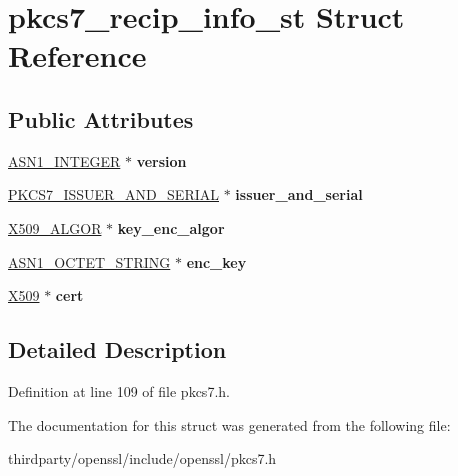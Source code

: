 \hypertarget{structpkcs7__recip__info__st}{}\section{pkcs7\+\_\+recip\+\_\+info\+\_\+st Struct Reference}
\label{structpkcs7__recip__info__st}
\subsection*{Public Attributes}
\begin{DoxyCompactItemize}
\item 
\mbox{\label{structpkcs7__recip__info__st_a2dab371fc11bb2b2a31c8d6ae805b7d4}} 
\hyperlink{structasn1__string__st}{A\+S\+N1\+\_\+\+I\+N\+T\+E\+G\+ER} $\ast$ {\bfseries version}
\item 
\mbox{\label{structpkcs7__recip__info__st_a518df74b0610022385c23e30d659c003}} 
\hyperlink{structpkcs7__issuer__and__serial__st}{P\+K\+C\+S7\+\_\+\+I\+S\+S\+U\+E\+R\+\_\+\+A\+N\+D\+\_\+\+S\+E\+R\+I\+AL} $\ast$ {\bfseries issuer\+\_\+and\+\_\+serial}
\item 
\mbox{\label{structpkcs7__recip__info__st_ad337ba9cf15d47888dfff734116dbed5}} 
\hyperlink{struct_x509__algor__st}{X509\+\_\+\+A\+L\+G\+OR} $\ast$ {\bfseries key\+\_\+enc\+\_\+algor}
\item 
\mbox{\label{structpkcs7__recip__info__st_a1dd5082129a2141e6a6ea4accc3ec700}} 
\hyperlink{structasn1__string__st}{A\+S\+N1\+\_\+\+O\+C\+T\+E\+T\+\_\+\+S\+T\+R\+I\+NG} $\ast$ {\bfseries enc\+\_\+key}
\item 
\mbox{\label{structpkcs7__recip__info__st_a6be787ca74a954b3bb37d84d46aa9418}} 
\hyperlink{structx509__st}{X509} $\ast$ {\bfseries cert}
\end{DoxyCompactItemize}


\subsection{Detailed Description}


Definition at line 109 of file pkcs7.\+h.



The documentation for this struct was generated from the following file\+:\begin{DoxyCompactItemize}
\item 
thirdparty/openssl/include/openssl/pkcs7.\+h\end{DoxyCompactItemize}

